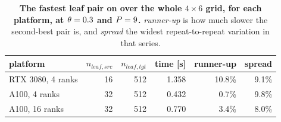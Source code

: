 \begin{table}[!htb]
\centering
\footnotesize
\caption[Leaf optimum by platform]{\textbf{The fastest leaf pair on
    \platMoleculeplatformshiftvsz{} over the whole $4 \times 6$ grid, for each platform, at
    $\theta = 0.3{}$ and $P = 9{}$.} \emph{runner-up} is how much
    slower the second-best pair is, and \emph{spread} the widest
    repeat-to-repeat variation in that series.\platMachineplatformshiftvsz}
\label{tab:platform_shift_1vsz}
\begin{tabular}{lrrrrr}
\toprule
platform & $n_{leaf,src}$ & $n_{leaf,tgt}$ & time [s] & runner-up & spread \\
\midrule
RTX 3080, 4 ranks & 16 & 512 & 1.358 & 10.8\% & 9.1\% \\
A100, 4 ranks & 32 & 512 & 0.432 & 0.7\% & 9.8\% \\
A100, 16 ranks & 32 & 512 & 0.770 & 3.4\% & 8.0\% \\

\bottomrule
\end{tabular}
\end{table}
